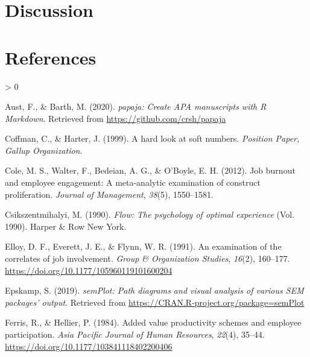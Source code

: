 \documentclass[
  english,
  man]{apa6}
\newlength{\cslhangindent}
\newenvironment{CSLReferences}[2] %
 {%
  \setlength{\parindent}{0pt}
  \ifodd #1 \everypar{\setlength{\hangindent}{\cslhangindent}}\ignorespaces\fi
  \ifnum #2 > 0
  \setlength{\parskip}{#2\baselineskip}
  \fi
 }%
 {}
\begin{document}
\hypertarget{discussion}{%
\section{Discussion}\label{discussion}}

\newpage

\hypertarget{references}{%
\section{References}\label{references}}

\begingroup
\setlength{\parindent}{-0.5in}
\setlength{\leftskip}{0.5in}

\hypertarget{refs}{}
\begin{CSLReferences}{1}{0}
\leavevmode\hypertarget{ref-R-papaja}{}%
Aust, F., \& Barth, M. (2020). \emph{{papaja}: {Create} {APA} manuscripts with {R Markdown}}. Retrieved from \url{https://github.com/crsh/papaja}

\leavevmode\hypertarget{ref-coffman_hard_1999}{}%
Coffman, C., \& Harter, J. (1999). A hard look at soft numbers. \emph{Position Paper, Gallup Organization}.

\leavevmode\hypertarget{ref-cole2012job}{}%
Cole, M. S., Walter, F., Bedeian, A. G., \& O'Boyle, E. H. (2012). Job burnout and employee engagement: A meta-analytic examination of construct proliferation. \emph{Journal of Management}, \emph{38}(5), 1550--1581.

\leavevmode\hypertarget{ref-csikszentmihalyi1990flow}{}%
Csikszentmihalyi, M. (1990). \emph{Flow: The psychology of optimal experience} (Vol. 1990). Harper \& Row New York.

\leavevmode\hypertarget{ref-elloy_examination_1991}{}%
Elloy, D. F., Everett, J. E., \& Flynn, W. R. (1991). An examination of the correlates of job involvement. \emph{Group \& Organization Studies}, \emph{16}(2), 160--177. \url{https://doi.org/10.1177/105960119101600204}

\leavevmode\hypertarget{ref-R-semPlot}{}%
Epskamp, S. (2019). \emph{semPlot: Path diagrams and visual analysis of various SEM packages' output}. Retrieved from \url{https://CRAN.R-project.org/package=semPlot}

\leavevmode\hypertarget{ref-ferris_added_1984}{}%
Ferris, R., \& Hellier, P. (1984). Added value productivity schemes and employee participation. \emph{Asia Pacific Journal of Human Resources}, \emph{22}(4), 35--44. \url{https://doi.org/10.1177/103841118402200406}


\end{CSLReferences}
\end{document}
